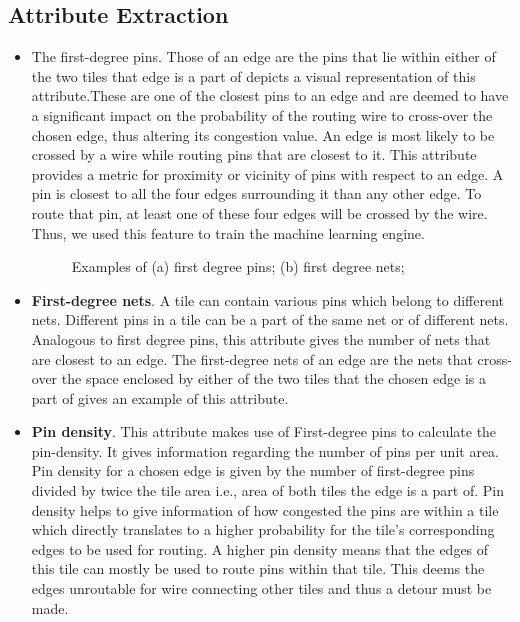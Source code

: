 \subsection{Attribute Extraction}
\begin{itemize}
\item The first-degree pins. Those of an edge are the pins that lie within either of the two tiles that edge is a part of  depicts a visual representation of this attribute.These are one of the closest pins to an edge and are deemed to have a significant impact on the probability of the routing wire to cross-over the chosen edge, thus altering its congestion value. An edge is most likely to be crossed by a wire while routing pins that are closest to it. This attribute provides a metric for proximity or vicinity of pins with respect to an edge. A pin is closest to all the four edges surrounding it than any other edge. To route that pin, at least one of these four edges will be crossed by the wire. Thus, we used this feature to train the machine learning engine.

\begin{figure}[tb!]
    \centering
    \caption{Examples of (a) first degree pins; (b) first degree nets;}
\end{figure}

\item \textbf{First-degree nets}. A tile can contain various pins which belong to different nets. Different pins in a tile can be a part of the same net or of different nets. Analogous to first degree pins, this attribute gives the number of nets that are closest to an edge. The first-degree nets of an edge are the nets that cross-over the space enclosed by either of the two tiles that the chosen edge is a part of   gives an example of this attribute.

\item \textbf{Pin density}. This attribute makes use of First-degree pins to calculate the pin-density. It gives information regarding the number of pins per unit area. Pin density for a chosen edge is given by the number of first-degree pins divided by twice the tile area i.e., area of both tiles the edge is a part of. Pin density helps to give information of how congested the pins are within a tile which directly translates to a higher probability for the tile's corresponding edges to be used for routing. A higher pin density means that the edges of this tile can mostly be used to route pins within that tile. This deems the edges unroutable for wire connecting other tiles and thus a detour must be made. 


\end{itemize}

